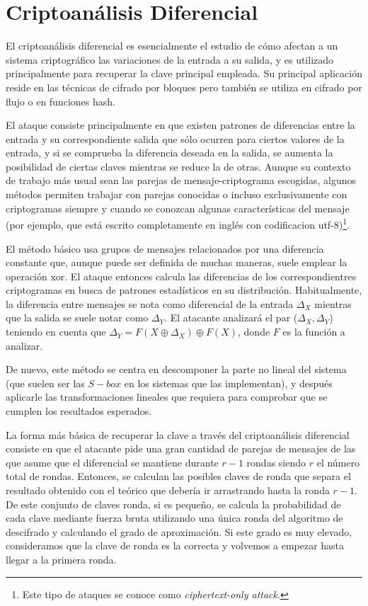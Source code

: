 \section{Criptoanálisis Diferencial}
\label{sec:diffcrypto}
El criptoanálisis diferencial es esencialmente el estudio de cómo afectan a un sistema criptográfico las variaciones de la entrada a su salida, y es utilizado principalmente para recuperar la clave principal empleada. Su principal aplicación reside en las técnicas de cifrado por bloques pero también se utiliza en cifrado por flujo o en funciones hash.

El ataque consiste principalmente en que existen patrones de diferencias entre la entrada y su correspondiente salida que sólo ocurren para ciertos valores de la entrada, y si se comprueba la diferencia deseada en la salida, se aumenta la posibilidad de ciertas claves mientras se reduce la de otras. Aunque su contexto de trabajo más usual sean las parejas de mensaje-criptograma escogidas, algunos métodos permiten trabajar con parejas conocidas o incluso exclusivamente con criptogramas siempre y cuando se conozcan algunas características del mensaje (por ejemplo, que está escrito completamente en inglés con codificacion utf-8)\footnote{Este tipo de ataques se conoce como \textit{ciphertext-only attack}.}. 

El método básico usa grupos de mensajes relacionados por una diferencia constante que, aunque puede ser definida de muchas maneras, suele emplear la operación xor. El ataque entonces calcula las diferencias de los correspondientres criptogramas en busca de patrones estadísticos en su distribución. Habitualmente, la diferencia entre mensajes se nota como diferencial de la entrada \textit{$\Delta_X$} mientras que la salida se suele notar como \textit{$\Delta_Y$}. El atacante analizará el par ($\Delta_X, \Delta_Y$) teniendo en cuenta que $\Delta_Y = F(X \oplus \Delta_X) \oplus F(X)$, donde $F$ es la función a analizar.

De nuevo, este método se centra en descomponer la parte no lineal del sistema (que suelen ser las $S-box$ en los sistemas que las implementan), y después aplicarle las transformaciones lineales que requiera para comprobar que se cumplen los resultados esperados.

La forma más básica de recuperar la clave a través del criptoanálisis diferencial consiste en que el atacante pide una gran cantidad de parejas de mensajes de las que asume que el diferencial se mantiene durante $r-1$ rondas siendo $r$ el número total de rondas. Entonces, se calculan las posibles claves de ronda que separa el resultado obtenido con el teórico que debería ir arrastrando hasta la ronda $r-1$. De este conjunto de claves ronda, si es pequeño, se calcula la probabilidad de cada clave mediante fuerza bruta utilizando una única ronda del algoritmo de descifrado y calculando el grado de aproximación. Si este grado es muy elevado, consideramos que la clave de ronda es la correcta y volvemos a empezar hasta llegar a la primera ronda.

